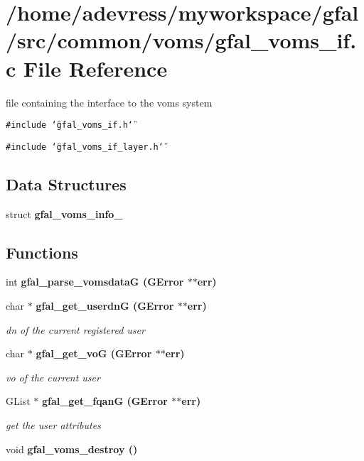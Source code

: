 \section{/home/adevress/myworkspace/gfal/src/common/voms/gfal\_\-voms\_\-if.c File Reference}
\label{gfal__voms__if_8c}
file containing the interface to the voms system 

{\tt \#include \char`\"{}gfal\_\-voms\_\-if.h\char`\"{}}\par
{\tt \#include \char`\"{}gfal\_\-voms\_\-if\_\-layer.h\char`\"{}}\par
\subsection*{Data Structures}
\begin{CompactItemize}
\item 
struct \textbf{gfal\_\-voms\_\-info\_\-}
\end{CompactItemize}
\subsection*{Functions}
\begin{CompactItemize}
\item 
int \bf{gfal\_\-parse\_\-vomsdata\-G} (GError $\ast$$\ast$err)
\item 
char $\ast$ \bf{gfal\_\-get\_\-userdn\-G} (GError $\ast$$\ast$err)
\begin{CompactList}\small\item\em dn of the current registered user \item\end{CompactList}\item 
char $\ast$ \bf{gfal\_\-get\_\-vo\-G} (GError $\ast$$\ast$err)
\begin{CompactList}\small\item\em vo of the current user \item\end{CompactList}\item 
GList $\ast$ \bf{gfal\_\-get\_\-fqan\-G} (GError $\ast$$\ast$err)
\begin{CompactList}\small\item\em get the user attributes \item\end{CompactList}\item 
void \bf{gfal\_\-voms\_\-destroy} ()
\end{CompactItemize}



